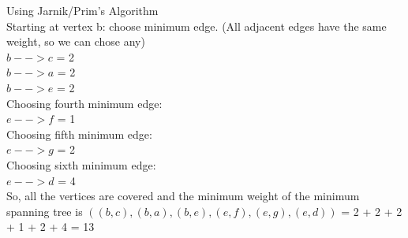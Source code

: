 \documentclass[12pt]{article}
\begin{document}
\begin{enumerate}
Using Jarnik/Prim's Algorithm \\
Starting at vertex b: choose minimum edge. (All adjacent edges have the same weight, so we can chose any) \\
\hspace*{30mm} $b --> c$ = 2 \\
\hspace*{30mm} $b --> a$ = 2 \\
\hspace*{30mm} $b --> e$ = 2 \\
Choosing fourth minimum edge: \\
\hspace*{30mm} $e --> f$ = 1 \\
Choosing fifth minimum edge: \\
\hspace*{30mm} $e --> g$ = 2 \\
Choosing sixth minimum edge: \\
\hspace*{30mm} $e --> d$ = 4\\
So, all the vertices are covered and the minimum weight of the minimum spanning tree is $((b,c),(b,a),(b,e),(e,f),(e,g),(e,d))$ = 2 + 2 + 2 + 1 + 2 + 4 = 13 \\


\end{enumerate}
\end{document}
